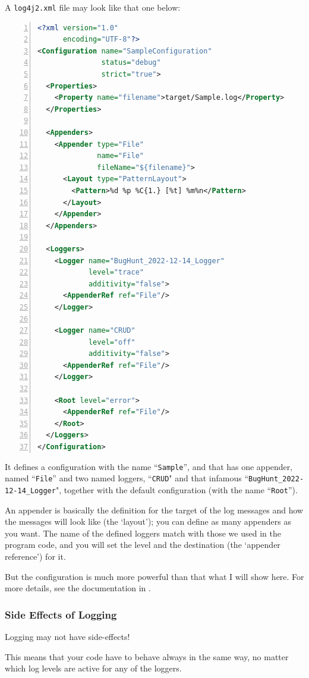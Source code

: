 \documentclass[11pt,a4paper, titlepage, parskip=half, headsepline, footsepline, cleardoublepage=current, headheight=1cm]{scrbook}
\begin{document}
A \verb#log4j2.xml# file may look like that one below:
\begin{lstlisting}[language=XML,numbers=left,caption={Sample Log4j Configuration}]
<?xml version="1.0"
      encoding="UTF-8"?>
<Configuration name="SampleConfiguration" 
               status="debug" 
               strict="true">
  <Properties>
    <Property name="filename">target/Sample.log</Property>
  </Properties>
 
  <Appenders>
    <Appender type="File" 
              name="File" 
              fileName="${filename}">
      <Layout type="PatternLayout">
        <Pattern>%d %p %C{1.} [%t] %m%n</Pattern>
      </Layout>
    </Appender>
  </Appenders>
 
  <Loggers>
    <Logger name="BugHunt_2022-12-14_Logger" 
            level="trace" 
            additivity="false">
      <AppenderRef ref="File"/>
    </Logger>
 
    <Logger name="CRUD" 
            level="off" 
            additivity="false">
      <AppenderRef ref="File"/>
    </Logger>
 
    <Root level="error">
      <AppenderRef ref="File"/>
    </Root>
  </Loggers>
</Configuration>
\end{lstlisting}

It defines a configuration with the name “\verb#Sample#”, and that has one appender, named “\verb#File#” and two named loggers, “\verb#CRUD#" and that infamous “\verb#BugHunt_2022-12-14_Logger#", together with the default configuration (with the name “\verb#Root#”).

An appender is basically the definition for the target of the log messages and how the messages will look like (the ‘layout’); you can define as many appenders as you want. The name of the defined loggers match with those we used in the program code, and you will set the level and the destination (the ‘appender reference’) for it.

But the configuration is much more powerful than that what I will show here. For more details, see the documentation in \autocite{APACHE_LOG4J:Configuration}.

\subsubsection{Side Effects of Logging}
Logging may not have side-effects!

This means that your code have to behave always in the same way, no matter which log levels are active for any of the loggers.
\end{document}
